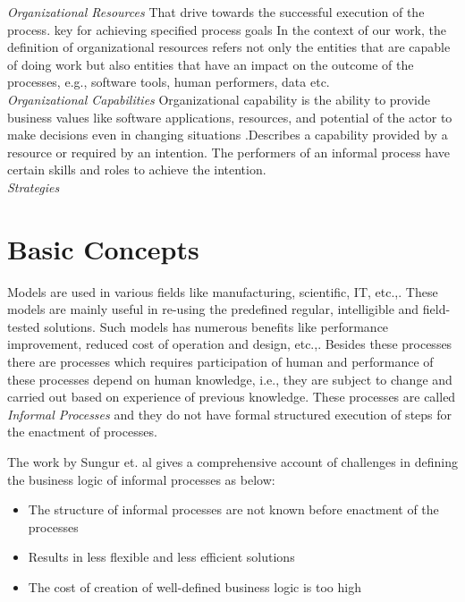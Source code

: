 \textit{Organizational Resources} That drive towards the successful execution of the process. key for achieving specified process goals
In the context of our work, the definition of organizational resources refers not only the entities that are capable of doing work but also entities that have an impact on the outcome of the processes, e.g., software tools, human performers, data etc.      \\


\textit{Organizational Capabilities} Organizational capability is the ability to provide business values like software applications, resources, and potential of the actor to make decisions even in changing situations \cite{Stirna2012}.Describes a capability provided by a resource or required by an intention. The performers of an informal process have certain skills and roles to achieve the intention.   \\






\textit{Strategies}         \\

\section{Basic Concepts}
\label{sec:basicconcepts}
Models are used in various fields like manufacturing, scientific, IT, etc.,. These models are mainly useful in re-using the predefined regular, intelligible and field-tested solutions. Such models has numerous benefits like performance improvement, reduced cost of operation and design, etc.,. Besides these processes there are processes which requires participation of human and performance of these  processes depend on human knowledge, i.e., they are subject to change and carried out based on experience of previous knowledge. These processes are called \textit{Informal Processes} and they do not have formal structured execution of steps for the enactment of processes. 

The work by Sungur et. al \cite{Sungur2014a} gives a comprehensive account of challenges in defining the business logic of informal processes as below:

\begin{itemize}
	\item The structure of informal processes are not known before enactment of the processes
	\item Results in less flexible and less efficient solutions
	\item The cost of creation of well-defined business logic is too high
\end{itemize}

